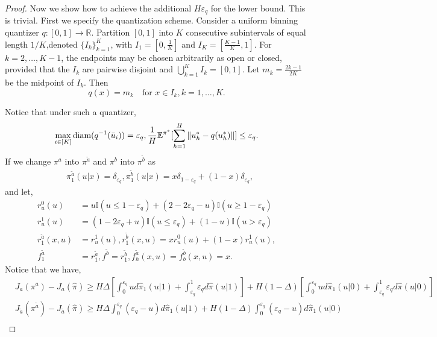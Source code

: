 \documentclass{article}
\begin{document}
\begin{proof}
    Now we show how to achieve the additional $H\varepsilon_q$ for the lower bound. This is trivial. First we specify the quantization scheme. Consider a uniform binning quantizer \(q:[0,1]\to\mathbb{R}\). Partition \([0,1]\) into \(K\) consecutive subintervals of equal length \(1/K\),denoted \(\{I_k\}_{k=1}^K\), with \(I_1=[0,\tfrac{1}{K}]\) and \(I_K=[\tfrac{K-1}{K},1]\).
For \(k=2,\ldots,K-1\), the endpoints may be chosen arbitrarily as open or closed, provided that the \(I_k\) are pairwise disjoint and \(\bigcup_{k=1}^K I_k=[0,1]\). Let \(m_k=\tfrac{2k-1}{2K}\) be the midpoint of \(I_k\). Then
\[
q(x)=m_k \quad \text{for } x\in I_k,k=1,\ldots,K.
\]

Notice that under such a quantizer,
\begin{equation*}
    \max_{i\in[K]}\textnormal{diam}(q^{-1}(\bar u_i))=\varepsilon_q, \frac{1}{H}\mathbb E^{\pi^*} [\sum_{h=1}^H\|u_h^*-q(u_h^*)\|]\leq \varepsilon_q.
\end{equation*}
If we change $\pi^a$ into $\pi^{\tilde a}$ and $\pi^b$ into $\pi^{\tilde b}$ as
    \begin{align*}
        &\pi^{\tilde a}_1(u|x) = \delta_{\varepsilon_q}, \pi_1^{\tilde b}(u|x)=x\delta_{1-\varepsilon_q}+(1-x)\delta_{\varepsilon_q}, 
    \end{align*}
    and let,
    \begin{align*}
    r_u^0(u) &= u\mathbb I(u\leq 1-\varepsilon_q)+(2-2\varepsilon_q -u)\mathbb I(u\geq 1-\varepsilon_q) \\
        r_u^1(u) &= (1-2\varepsilon_q+u)\mathbb I(u\leq \varepsilon_q)+(1-u)\mathbb I(u>\varepsilon_q)\\
        r_1^{\tilde a}(x,u)&=r_u^1(u), r_1^{\tilde b}(x,u) = xr_u^0(u)+(1-x)r_u^1(u),\\
        f^{\tilde a}_1&=r^{\tilde a}_1, f^{\tilde b}=r^{\tilde b}_1, f_h^{\tilde a}(x,u)=f_b^{\tilde b}(x,u)=x.
    \end{align*}
Notice that we have,
    \begin{align*}
        &J_{a}(\pi^a)-J_{a}(\hat \pi)\geq H\Delta\left[\int_{0}^{\varepsilon_q}ud\hat \pi_1(u|1)+\int_{\varepsilon_q}^1 \varepsilon_qd\hat \pi(u|1)\right]+H(1-\Delta)\left[\int_{0}^{\varepsilon_q}ud\hat \pi_1(u|0)+\int_{\varepsilon_q}^1 \varepsilon_qd\hat \pi(u|0)\right] \\
        &J_{\tilde a}(\pi^{\tilde a})-J_{\tilde a}(\hat \pi)\geq H\Delta\int_0^{\varepsilon_q}(\varepsilon_q-u)d\hat \pi_1(u|1)+H(1-\Delta)\int_0^{\varepsilon_q}(\varepsilon_q-u)d\hat \pi_1(u|0)\\

\end{align*}
\end{proof}
\end{document}
